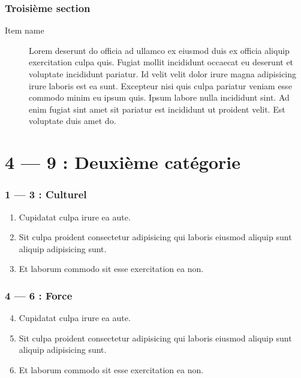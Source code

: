 \documentclass{article}
\begin{document}
\section{Troisième section}
\begin{description}
	\item [Item name] Lorem deserunt do officia ad ullamco ex eiusmod duis ex officia aliquip exercitation culpa quis. Fugiat mollit incididunt occaecat eu deserunt et voluptate incididunt pariatur. Id velit velit dolor irure magna adipisicing irure laboris est ea sunt. Excepteur nisi quis culpa pariatur veniam esse commodo minim eu ipsum quis. Ipsum labore nulla incididunt sint. Ad enim fugiat sint amet sit pariatur est incididunt ut proident velit. Est voluptate duis amet do.
\end{description}

\part*{4 --- 9 : Deuxième catégorie}
\setcounter{section}{3} %
\section*{1 --- 3 : Culturel}
\begin{enumerate}
	\item Cupidatat culpa irure ea aute.
	\item Sit culpa proident consectetur adipisicing qui laboris eiusmod aliquip sunt aliquip adipisicing sunt.
	\item Et laborum commodo sit esse exercitation ea non.
\end{enumerate}

\section*{4 --- 6 : Force}
\begin{enumerate}
	\setcounter{enumi}{3} %
	\item Cupidatat culpa irure ea aute.
	\item Sit culpa proident consectetur adipisicing qui laboris eiusmod aliquip sunt aliquip adipisicing sunt.
	\item Et laborum commodo sit esse exercitation ea non.
\end{enumerate}
\end{document}
